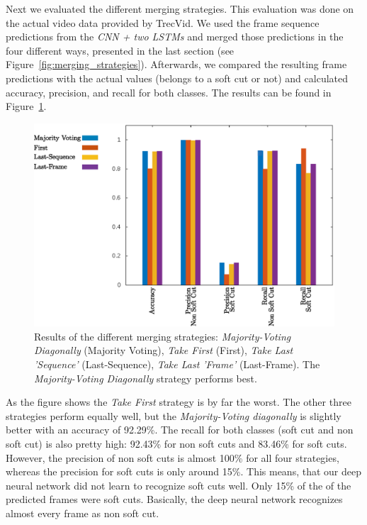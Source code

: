 Next we evaluated the different merging strategies.
This evaluation was done on the actual video data provided by TrecVid.
We used the frame sequence predictions from the \textit{CNN + two LSTMs} and merged those predictions in the four different ways, presented in the last section (see Figure~\ref{fig:merging_strategies}).
Afterwards, we compared the resulting frame predictions with the actual values (belongs to a soft cut or not) and calculated accuracy, precision, and recall for both classes.
The results can be found in Figure~\ref{fig:evaluation_net}.
\begin{figure}[!htb]
	\centering
	\includegraphics[scale=.7]{images/evalutation_net.eps}
	\caption{Results of the different merging strategies: \textit{Majority-Voting Diagonally} (Majority Voting), \textit{Take First} (First), \textit{Take Last 'Sequence'} (Last-Sequence), \textit{Take Last 'Frame'} (Last-Frame). The \textit{Majority-Voting Diagonally} strategy performs best.}
	\label{fig:evaluation_net}
\end{figure}
As the figure shows the \textit{Take First} strategy is by far the worst.
The other three strategies perform equally well, but the \textit{Majority-Voting diagonally} is slightly better with an accuracy of 92.29\%.
The recall for both classes (soft cut and non soft cut) is also pretty high: 92.43\% for non soft cuts and 83.46\% for soft cuts.
However, the precision of non soft cuts is almost 100\% for all four strategies, whereas the precision for soft cuts is only around 15\%.
This means, that our deep neural network did not learn to recognize soft cuts well.
Only 15\% of the of the predicted frames were soft cuts.
Basically, the deep neural network recognizes almost every frame as non soft cut.

